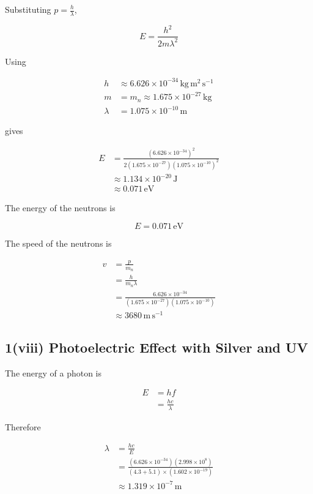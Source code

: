 \documentclass{article}
\begin{document}
Substituting $p = \frac{h}{\lambda}$,

\begin{equation*}
E = \frac{h^2}{2m\lambda^2}
\end{equation*}

Using

\begin{align*}
h &\approx 6.626 \times 10^{-34} \,\mathrm{kg\,m^{2}\,s^{-1}} \\
m &= m_n \approx 1.675 \times 10^{-27} \,\mathrm{kg} \\
\lambda &= 1.075 \times 10^{-10} \,\mathrm{m}
\end{align*}

gives

\begin{align*}
E &= \frac{(6.626 \times 10^{-34})^2}{2(1.675 \times 10^{-27})(1.075 \times 10^{-10})^2} \\
&\approx 1.134 \times 10^{-20} \,\mathrm{J} \\
&\approx 0.071 \,\mathrm{eV}
\end{align*}

The energy of the neutrons is

\begin{equation*}
\boxed{E = 0.071 \,\mathrm{eV}}
\end{equation*}

The speed of the neutrons is

\begin{align*}
v &= \frac{p}{m_n} \\
&= \frac{h}{m_n\lambda} \\
&= \frac{6.626 \times 10^{-34}}{(1.675 \times 10^{-27})(1.075 \times 10^{-10})} \\
&\approx 3680 \,\mathrm{m\,s^{-1}}
\end{align*}


\subsection*{1(viii) Photoelectric Effect with Silver and UV}

The energy of a photon is

\begin{align*}
E &= hf \\
&= \frac{hc}{\lambda}
\end{align*}

Therefore

\begin{align*}
\lambda &= \frac{hc}{E} \\
&= \frac{(6.626 \times 10^{-34})(2.998 \times 10^8)}{(4.3+5.1) \times (1.602 \times 10^{-19})} \\
&\approx 1.319 \times 10^{-7} \,\mathrm{m}
\end{align*}
\end{document}
